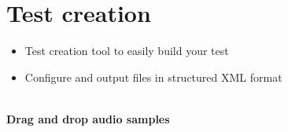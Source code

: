 \vspace{-0.8cm}
\section{Test creation} %

\begin{itemize}
	\item Test creation tool to easily build your test
	\item Configure and output files in structured XML format
\end{itemize}

\begin{center}
\\ %
\small
\textbf{Drag and drop audio samples}
\end{center}